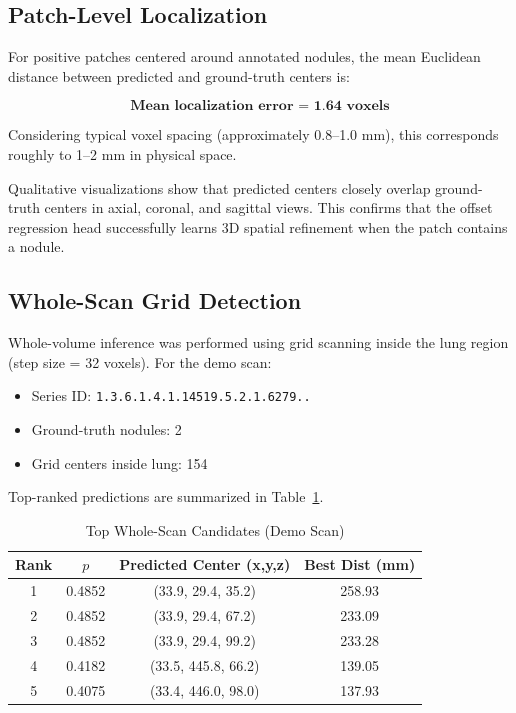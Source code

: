 \documentclass[conference]{IEEEtran}
\begin{document}
\subsection{Patch-Level Localization}

For positive patches centered around annotated nodules, the mean Euclidean distance between predicted and ground-truth centers is:

\[
\textbf{Mean localization error = 1.64 voxels}
\]

Considering typical voxel spacing (approximately 0.8--1.0 mm), this corresponds roughly to 1--2 mm in physical space. 

Qualitative visualizations show that predicted centers closely overlap ground-truth centers in axial, coronal, and sagittal views. This confirms that the offset regression head successfully learns 3D spatial refinement when the patch contains a nodule.

\subsection{Whole-Scan Grid Detection}

Whole-volume inference was performed using grid scanning inside the lung region (step size = 32 voxels). For the demo scan:

\begin{itemize}
\item Series ID: \texttt{1.3.6.1.4.1.14519.5.2.1.6279..}
\item Ground-truth nodules: 2
\item Grid centers inside lung: 154
\end{itemize}

Top-ranked predictions are summarized in Table~\ref{tab:wholescan}.

\begin{table}[H]
\centering
\caption{Top Whole-Scan Candidates (Demo Scan)}
\label{tab:wholescan}
\begin{tabular}{cccc}
\toprule
Rank & $p$ & Predicted Center (x,y,z) & Best Dist (mm) \\
\midrule
1 & 0.4852 & (33.9, 29.4, 35.2) & 258.93 \\
2 & 0.4852 & (33.9, 29.4, 67.2) & 233.09 \\
3 & 0.4852 & (33.9, 29.4, 99.2) & 233.28 \\
4 & 0.4182 & (33.5, 445.8, 66.2) & 139.05 \\
5 & 0.4075 & (33.4, 446.0, 98.0) & 137.93 \\
\bottomrule
\end{tabular}
\end{table}
\end{document}
